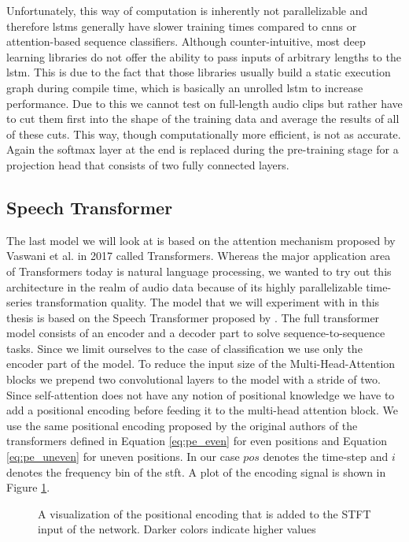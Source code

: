 Unfortunately, this way of computation is inherently not parallelizable and therefore \glspl{lstm} generally have slower training times compared to \glspl{cnn} or attention-based sequence classifiers. Although counter-intuitive, most deep learning libraries do not offer the ability to pass inputs of arbitrary lengths to the \gls{lstm}. This is due to the fact that those libraries usually build a static execution graph during compile time, which is basically an unrolled \gls{lstm} to increase performance. Due to this we cannot test on full-length audio clips but rather have to cut them first into the shape of the training data and average the results of all of these cuts. This way, though computationally more efficient, is not as accurate. Again the softmax layer at the end is replaced during the pre-training stage for a projection head that consists of two fully connected layers.

\subsection{Speech Transformer}

The last model we will look at is based on the attention mechanism proposed by Vaswani et al. in 2017 \cite{NIPS2017_7181} called Transformers. Whereas the major application area of Transformers today is natural language processing, we wanted to try out this architecture in the realm of audio data because of its highly parallelizable time-series transformation quality. The model that we will experiment with in this thesis is based on the Speech Transformer proposed by \cite{zhao2019speechtransformer}. The full transformer model consists of an encoder and a decoder part to solve sequence-to-sequence tasks. Since we limit ourselves to the case of classification we use only the encoder part of the model. To reduce the input size of the Multi-Head-Attention blocks we prepend two convolutional layers to the model with a stride of two. Since self-attention does not have any notion of positional knowledge we have to add a positional encoding before feeding it to the multi-head attention block. We use the same positional encoding proposed by the original authors of the transformers defined in Equation \ref{eq:pe_even} for even positions and Equation \ref{eq:pe_uneven} for uneven positions. In our case $pos$ denotes the time-step and $i$ denotes the frequency bin of the \gls{stft}. A plot of the encoding signal is shown in Figure \ref{fig:pos_encoding}. 

\begin{figure}[!h]
    \centering
    
    \caption[Positional Encoding]{A visualization of the positional encoding that is added to the STFT input of the network. Darker colors indicate higher values}
    \label{fig:pos_encoding}
\end{figure}

